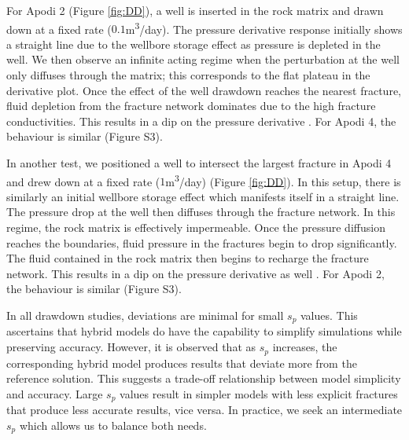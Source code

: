 \documentclass[draft]{agujournal2018}
\begin{document}
For Apodi 2 (Figure \ref{fig:DD}), a well is inserted in the rock matrix and drawn down at a fixed rate ($0.1$m\textsuperscript{3}/day). The pressure derivative response initially shows a straight line due to the wellbore storage effect as pressure is depleted in the well. We then observe an infinite acting regime when the perturbation at the well only diffuses through the matrix; this corresponds to the flat plateau in the derivative plot. Once the effect of the well drawdown reaches the nearest fracture, fluid depletion from the fracture network dominates due to the high fracture conductivities. This results in a dip on the pressure derivative \citep{Bourdet1989, Cinco-Ley1976, Egya2018}. For Apodi 4, the behaviour is similar (Figure S3).

In another test, we positioned a well to intersect the largest fracture in Apodi 4 and drew down at a fixed rate ($1$m\textsuperscript{3}/day) (Figure \ref{fig:DD}). In this setup, there is similarly an initial wellbore storage effect which manifests itself in a straight line. The pressure drop at the well then diffuses through the fracture network. In this regime, the rock matrix is effectively impermeable. Once the pressure diffusion reaches the boundaries, fluid pressure in the fractures begin to drop significantly. The fluid contained in the rock matrix then begins to recharge the fracture network. This results in a dip on the pressure derivative as well \citep{Gringarten1987}. For Apodi 2, the behaviour is similar (Figure S3).

In all drawdown studies, deviations are minimal for small $s_p$ values. This ascertains that hybrid models do have the capability to simplify simulations while preserving accuracy. However, it is observed that as $s_p$ increases, the corresponding hybrid model produces results that deviate more from the reference solution. This suggests a trade-off relationship between model simplicity and accuracy. Large $s_p$ values result in simpler models with less explicit fractures that produce less accurate results, vice versa. In practice, we seek an intermediate $s_p$ which allows us to balance both needs. 
\end{document}
